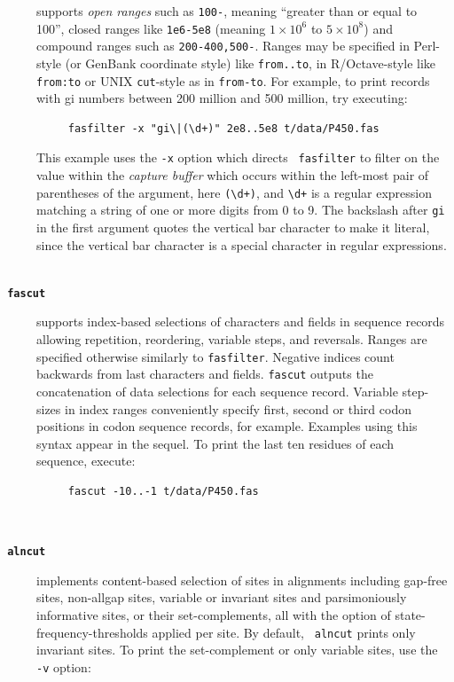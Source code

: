 \documentclass{frontiersSCNS} %
\begin{document}
\begin{description}
supports {\it open ranges} such as {\tt 100-}, meaning ``greater than or
equal to 100'', closed ranges like {\tt 1e6-5e8} (meaning $1 \times
10^{6}$ to $5 \times 10^{8}$) and compound ranges
such as {\tt 200-400,500-}. Ranges may be specified in Perl-style (or
GenBank coordinate style) like {\tt from..to}, in R/Octave-style like
{\tt from:to} or UNIX {\tt cut}-style as in {\tt from-to}. For
example, to print records with gi numbers between 200 million and 500
million, try executing:
\begin{verbatim}
     fasfilter -x "gi\|(\d+)" 2e8..5e8 t/data/P450.fas
\end{verbatim}
\noindent This example uses the {\tt -x} option which directs {\tt
  fasfilter} to filter on the value within the {\it capture buffer}
which occurs within the left-most pair of parentheses of the argument,
here \verb|(\d+)|, and \verb|\d+| is a regular expression matching a
string of one or more digits from 0 to 9. The backslash after
\verb|gi| in the first argument quotes the vertical bar character to
make it literal, since the vertical bar character is a special
character in regular expressions. \\
\\
\item[\texttt{\textbf{  fascut}} ] supports index-based selections of
characters and fields in sequence records allowing repetition,
reordering, variable steps, and reversals.  Ranges are specified
otherwise similarly to {\tt fasfilter}. Negative indices count
backwards from last characters and fields. {\tt fascut} outputs the
concatenation of data selections for each sequence record.  Variable
step-sizes in index ranges conveniently specify first, second or third
codon positions in codon sequence records, for example. Examples using
this syntax appear in the sequel. To print the last ten residues of
each sequence, execute:
\begin{verbatim}
     fascut -10..-1 t/data/P450.fas
\end{verbatim}
\\
\item[\texttt{\textbf{ alncut}} ] implements content-based selection of
  sites in alignments including gap-free sites, non-allgap sites,
  variable or invariant sites and parsimoniously informative sites, or
  their set-complements, all with the option of
  state-frequency-thresholds applied per site. By default, {\tt
    alncut} prints only invariant sites. To print the set-complement
  or only variable sites, use the \verb|-v| option:


\end{description}
\end{document}
